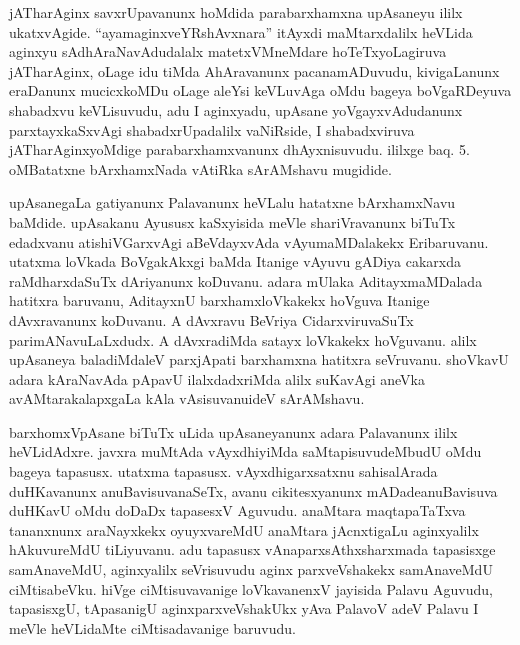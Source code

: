 
\begin{artha}
jATharAginx savxrUpavanunx hoMdida parabarxhamxna upAsaneyu ililx ukatxvAgide. ``ayamaginxveYRshAvxnara'' itAyxdi maMtarxdalilx heVLida aginxyu sAdhAraNavAdudalalx matetxVMneMdare hoTeTxyoLagiruva jATharAginx, oLage idu tiMda AhAravanunx pacanamADuvudu, kivigaLanunx eraDanunx mucicxkoMDu oLage aleYsi keVLuvAga oMdu bageya boVgaRDeyuva shabadxvu keVLisuvudu, adu I aginxyadu, upAsane yoVgayxvAdudanunx parxtayxkaSxvAgi shabadxrUpadalilx vaNiRside, I shabadxviruva jATharAginxyoMdige parabarxhamxvanunx dhAyxnisuvudu. ililxge baq. 5. oMBatatxne bArxhamxNada vAtiRka sArAMshavu mugidide.
\end{artha}


\begin{artha}
upAsanegaLa gatiyanunx Palavanunx heVLalu hatatxne bArxhamxNavu baMdide. upAsakanu Ayususx kaSxyisida meVle shariVravanunx biTuTx edadxvanu atishiVGarxvAgi aBeVdayxvAda vAyumaMDalakekx Eribaruvanu. utatxma loVkada BoVgakAkxgi baMda Itanige vAyuvu gADiya cakarxda raMdharxdaSuTx dAriyanunx koDuvanu. adara mUlaka AditayxmaMDalada hatitxra baruvanu, AditayxnU barxhamxloVkakekx hoVguva Itanige dAvxravanunx koDuvanu. A dAvxravu BeVriya CidarxviruvaSuTx parimANavuLaLxdudx. A dAvxradiMda satayx loVkakekx hoVguvanu. alilx upAsaneya baladiMdaleV parxjApati barxhamxna hatitxra seVruvanu. shoVkavU adara kAraNavAda pApavU ilalxdadxriMda alilx suKavAgi aneVka avAMtarakalapxgaLa kAla vAsisuvanu\ndash  ideV sArAMshavu.
\end{artha}



\begin{artha}
barxhomxVpAsane biTuTx uLida upAsaneyanunx adara Palavanunx ililx heVLidAdxre. javxra muMtAda vAyxdhiyiMda saMtapisuvudeMbudU oMdu bageya tapasusx. utatxma tapasusx. vAyxdhigarxsatxnu sahisalArada duHKavanunx anuBavisuvanaSeTx, avanu cikitesxyanunx mADade\break anuBavisuva duHKavU oMdu doDaDx tapasesxV Aguvudu. anaMtara maqtapaTaTxva tananxnunx araNayxkekx oyuyxvareMdU anaMtara jAcnxtigaLu aginxyalilx hAkuvureMdU tiLiyuvanu. adu tapasusx vAnaparxsAthxsharxmada tapasisxge samAnaveMdU, aginxyalilx seVrisuvudu aginx parxveVshakekx samAnaveMdU ciMtisabeVku. hiVge ciMtisuvavanige loVkavanenxV jayisida Palavu Aguvudu, tapasisxgU, tApasanigU aginxparxveVshakUkx yAva PalavoV adeV Palavu I meVle heVLidaMte ciMtisadavanige baruvudu.
\end{artha}

